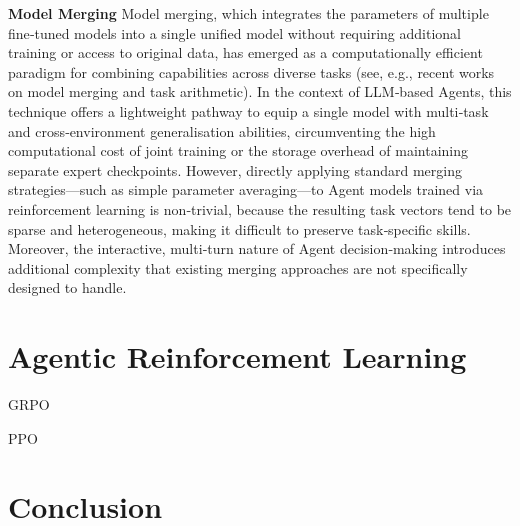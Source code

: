 \documentclass[]{selfevolagent}
\theoremstyle{plain}
\theoremstyle{definition}
\theoremstyle{remark}
\begin{document}
\noindent \textbf{Model Merging} Model merging, which integrates the parameters of multiple fine‑tuned models into a single unified model without requiring additional training or access to original data, has emerged as a computationally efficient paradigm for combining capabilities across diverse tasks (see, e.g., recent works on model merging and task arithmetic). In the context of LLM‑based Agents, this technique offers a lightweight pathway to equip a single model with multi‑task and cross‑environment generalisation abilities, circumventing the high computational cost of joint training or the storage overhead of maintaining separate expert checkpoints. However, directly applying standard merging strategies—such as simple parameter averaging—to Agent models trained via reinforcement learning is non‑trivial, because the resulting task vectors tend to be sparse and heterogeneous, making it difficult to preserve task‑specific skills. Moreover, the interactive, multi‑turn nature of Agent decision‑making introduces additional complexity that existing merging approaches are not specifically designed to handle.


\section{Agentic Reinforcement Learning}

GRPO

PPO


\section{Conclusion}
\label{sec:conclusion}




\clearpage
\end{document}
